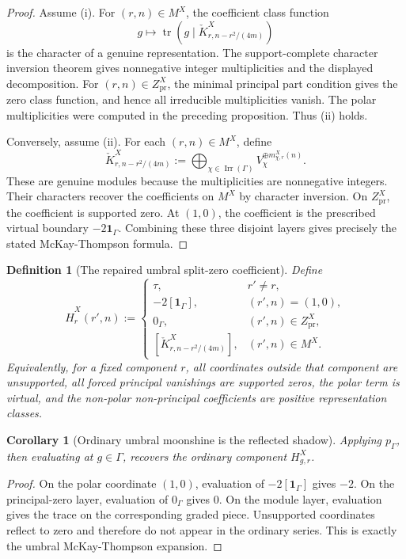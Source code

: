 \documentclass[11pt]{article}
\newtheorem{corollary}[theorem]{Corollary}
\newtheorem{definition}[theorem]{Definition}
\newcommand{\Irr}{\operatorname{Irr}}
\newcommand{\tr}{\operatorname{tr}}
\newcommand{\one}{\mathbf 1}
\begin{document}
\begin{proof}
Assume (i).  For \((r,n)\in M^X\), the coefficient class function
\[
g\mapsto\tr(g\mid\check K^X_{r,n-r^2/(4m)})
\]
is the character of a genuine representation.  The support-complete character inversion theorem gives nonnegative integer multiplicities and the displayed decomposition.  For \((r,n)\in Z^X_{\mathrm{pr}}\), the minimal principal part condition gives the zero class function, and hence all irreducible multiplicities vanish.  The polar multiplicities were computed in the preceding proposition.  Thus (ii) holds.

Conversely, assume (ii).  For each \((r,n)\in M^X\), define
\[
\check K^X_{r,n-r^2/(4m)}:=\bigoplus_{\chi\in\Irr(\Gamma)}V_\chi^{\oplus m^X_{\chi,r}(n)}.
\]
These are genuine modules because the multiplicities are nonnegative integers.  Their characters recover the coefficients on \(M^X\) by character inversion.  On \(Z^X_{\mathrm{pr}}\), the coefficient is supported zero.  At \((1,0)\), the coefficient is the prescribed virtual boundary \(-2\one_\Gamma\).  Combining these three disjoint layers gives precisely the stated McKay-Thompson formula.
\end{proof}

\begin{definition}[The repaired umbral split-zero coefficient]
Define
\[
\widehat H^X_r(r',n):=
\begin{cases}
\tau,&r'\ne r,\\
-2[\one_\Gamma],&(r',n)=(1,0),\\
0_\Gamma,&(r',n)\in Z^X_{\mathrm{pr}},\\
[\check K^X_{r,n-r^2/(4m)}],&(r',n)\in M^X.
\end{cases}
\]
Equivalently, for a fixed component \(r\), all coordinates outside that component are unsupported, all forced principal vanishings are supported zeros, the polar term is virtual, and the non-polar non-principal coefficients are positive representation classes.
\end{definition}

\begin{corollary}[Ordinary umbral moonshine is the reflected shadow]
Applying \(p_\Gamma\), then evaluating at \(g\in\Gamma\), recovers the ordinary component \(H^X_{g,r}\).
\end{corollary}

\begin{proof}
On the polar coordinate \((1,0)\), evaluation of \(-2[\one_\Gamma]\) gives \(-2\).  On the principal-zero layer, evaluation of \(0_\Gamma\) gives \(0\).  On the module layer, evaluation gives the trace on the corresponding graded piece.  Unsupported coordinates reflect to zero and therefore do not appear in the ordinary series.  This is exactly the umbral McKay-Thompson expansion.
\end{proof}
\end{document}
